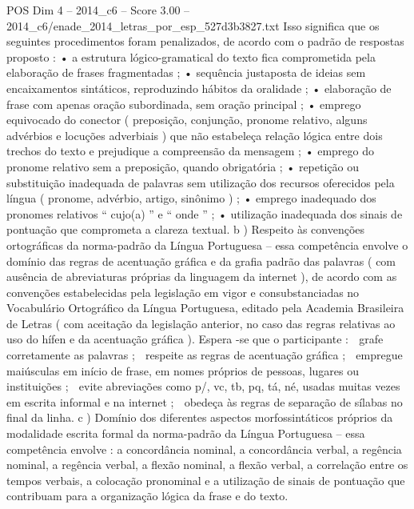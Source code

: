 \begin{textsample}{POS Dim 4 – 2014\_c6 – Score 3.00 – 2014\_c6/enade\_2014\_letras\_por\_esp\_527d3b3827.txt}
Isso significa que os seguintes procedimentos foram penalizados, de acordo com o padrão de respostas proposto : • a estrutura lógico-gramatical do texto fica comprometida pela elaboração de frases fragmentadas ; • sequência justaposta de ideias sem encaixamentos sintáticos, reproduzindo hábitos da oralidade ; • elaboração de frase com apenas oração subordinada, sem oração principal ; • emprego equivocado do conector ( preposição, conjunção, pronome relativo, alguns advérbios e locuções adverbiais ) que não estabeleça relação lógica entre dois trechos do texto e prejudique a compreensão da mensagem ; • emprego do pronome relativo sem a preposição, quando obrigatória ; • repetição ou substituição inadequada de palavras sem utilização dos recursos oferecidos pela língua ( pronome, advérbio, artigo, sinônimo ) ; • emprego inadequado dos pronomes relativos “ cujo(a) ” e “ onde ” ; • utilização inadequada dos sinais de pontuação que comprometa a clareza textual. b ) Respeito às convenções ortográficas da norma-padrão da Língua Portuguesa – essa competência envolve o domínio das regras de acentuação gráfica e da grafia padrão das palavras ( com ausência de abreviaturas próprias da linguagem da internet ), de acordo com as convenções estabelecidas pela legislação em vigor e consubstanciadas no Vocabulário Ortográfico da Língua Portuguesa, editado pela Academia Brasileira de Letras ( com aceitação da legislação anterior, no caso das regras relativas ao uso do hífen e da acentuação gráfica ).
Espera -se que o participante :  grafe corretamente as palavras ;  respeite as regras de acentuação gráfica ;  empregue maiúsculas em início de frase, em nomes próprios de pessoas, lugares ou instituições ;  evite abreviações como p/, vc, tb, pq, tá, né, usadas muitas vezes em escrita informal e na internet ;  obedeça às regras de separação de sílabas no final da linha. c ) Domínio dos diferentes aspectos morfossintáticos próprios da modalidade escrita formal da norma-padrão da Língua Portuguesa – essa competência envolve : a concordância nominal, a concordância verbal, a regência nominal, a regência verbal, a flexão nominal, a flexão verbal, a correlação entre os tempos verbais, a colocação pronominal e a utilização de sinais de pontuação que contribuam para a organização lógica da frase e do texto.

\end{textsample}
